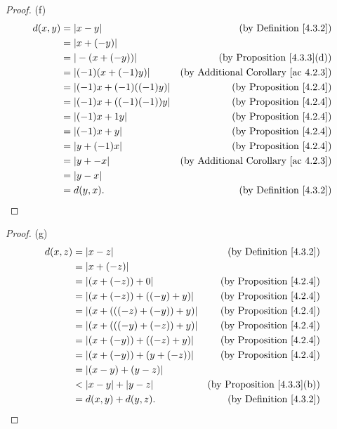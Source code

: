\begin{proof}{(f)}
\begin{align*}
d(x, y) &= |x - y| & \text{(by Definition \ref{4.3.2})} \\
&= |x + (-y)| \\
&= |-(x + (-y))| & \text{(by Proposition \ref{4.3.3}(d))} \\
&= |(-1)(x + (-1)y)| & \text{(by Additional Corollary \ref{ac 4.2.3})} \\
&= |(-1)x + (-1)((-1)y)| & \text{(by Proposition \ref{4.2.4})} \\
&= |(-1)x + ((-1)(-1))y| & \text{(by Proposition \ref{4.2.4})} \\
&= |(-1)x + 1y| & \text{(by Proposition \ref{4.2.4})} \\
&= |(-1)x + y| & \text{(by Proposition \ref{4.2.4})} \\
&= |y + (-1)x| & \text{(by Proposition \ref{4.2.4})} \\
&= |y + -x| & \text{(by Additional Corollary \ref{ac 4.2.3})} \\
&= |y - x| \\
&= d(y, x). & \text{(by Definition \ref{4.3.2})}
\end{align*}
\end{proof}

\begin{proof}{(g)}
\begin{align*}
d(x, z) &= |x - z| & \text{(by Definition \ref{4.3.2})} \\
&= |x + (-z)| \\
&= |(x + (-z)) + 0| & \text{(by Proposition \ref{4.2.4})} \\
&= |(x + (-z)) + ((-y) + y)| & \text{(by Proposition \ref{4.2.4})} \\
&= |(x + (((-z) + (-y)) + y)| & \text{(by Proposition \ref{4.2.4})} \\
&= |(x + (((-y) + (-z)) + y)| & \text{(by Proposition \ref{4.2.4})} \\
&= |(x + (-y)) + ((-z) + y)| & \text{(by Proposition \ref{4.2.4})} \\
&= |(x + (-y)) + (y + (-z))| & \text{(by Proposition \ref{4.2.4})} \\
&= |(x - y) + (y - z)| \\
&< |x - y| + |y - z| & \text{(by Proposition \ref{4.3.3}(b))} \\
&= d(x, y) + d(y, z). & \text{(by Definition \ref{4.3.2})} \\
\end{align*}
\end{proof}

